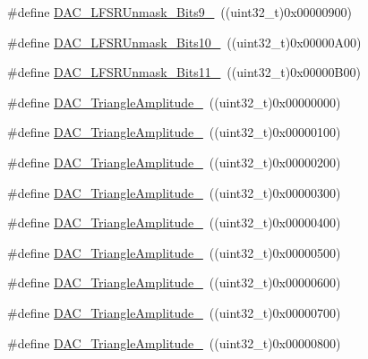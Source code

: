 \begin{DoxyCompactItemize}
\item 
\#define \hyperlink{group___d_a_c__lfsrunmask__triangleamplitude_gaf7f4540d9ec6efe074e1e4485f9a347a}{D\+A\+C\+\_\+\+L\+F\+S\+R\+Unmask\+\_\+\+Bits9\+\_}~((uint32\+\_\+t)0x00000900)
\item 
\#define \hyperlink{group___d_a_c__lfsrunmask__triangleamplitude_ga7670f0e10f062571d0e56027ef653228}{D\+A\+C\+\_\+\+L\+F\+S\+R\+Unmask\+\_\+\+Bits10\+\_}~((uint32\+\_\+t)0x00000\+A00)
\item 
\#define \hyperlink{group___d_a_c__lfsrunmask__triangleamplitude_gaeb9b5992b771f9a14587eeda58227831}{D\+A\+C\+\_\+\+L\+F\+S\+R\+Unmask\+\_\+\+Bits11\+\_}~((uint32\+\_\+t)0x00000\+B00)
\item 
\#define \hyperlink{group___d_a_c__lfsrunmask__triangleamplitude_ga49b1eddf4e6371b4be8751162dc94ac4}{D\+A\+C\+\_\+\+Triangle\+Amplitude\+\_}~((uint32\+\_\+t)0x00000000)
\item 
\#define \hyperlink{group___d_a_c__lfsrunmask__triangleamplitude_ga9798d68c3bbf0a57306bf2f962697377}{D\+A\+C\+\_\+\+Triangle\+Amplitude\+\_}~((uint32\+\_\+t)0x00000100)
\item 
\#define \hyperlink{group___d_a_c__lfsrunmask__triangleamplitude_gad3f31de1277836df1109576a53c47e87}{D\+A\+C\+\_\+\+Triangle\+Amplitude\+\_}~((uint32\+\_\+t)0x00000200)
\item 
\#define \hyperlink{group___d_a_c__lfsrunmask__triangleamplitude_ga42653712ce783d33ecb2f3e97e9c2ece}{D\+A\+C\+\_\+\+Triangle\+Amplitude\+\_}~((uint32\+\_\+t)0x00000300)
\item 
\#define \hyperlink{group___d_a_c__lfsrunmask__triangleamplitude_ga10b15745b749c62a56bd3d7bd5a27e1b}{D\+A\+C\+\_\+\+Triangle\+Amplitude\+\_}~((uint32\+\_\+t)0x00000400)
\item 
\#define \hyperlink{group___d_a_c__lfsrunmask__triangleamplitude_gaaae92dae9c4da55e29c645396825e36b}{D\+A\+C\+\_\+\+Triangle\+Amplitude\+\_}~((uint32\+\_\+t)0x00000500)
\item 
\#define \hyperlink{group___d_a_c__lfsrunmask__triangleamplitude_gaacec0af3f69db46f8984be3af9ecadfb}{D\+A\+C\+\_\+\+Triangle\+Amplitude\+\_}~((uint32\+\_\+t)0x00000600)
\item 
\#define \hyperlink{group___d_a_c__lfsrunmask__triangleamplitude_gadb404422c86a7b92d78e6d9617e8ce4d}{D\+A\+C\+\_\+\+Triangle\+Amplitude\+\_}~((uint32\+\_\+t)0x00000700)
\item 
\#define \hyperlink{group___d_a_c__lfsrunmask__triangleamplitude_ga565b0c97bbdf152756617d491bf8ef85}{D\+A\+C\+\_\+\+Triangle\+Amplitude\+\_}~((uint32\+\_\+t)0x00000800)

\end{DoxyCompactItemize}
